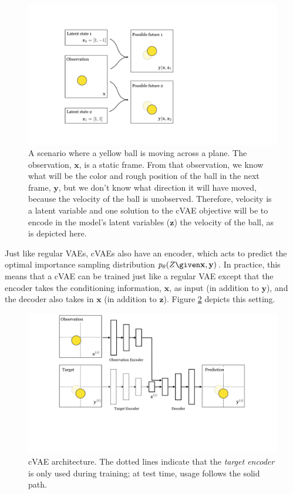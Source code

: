 \begin{figure}[h!]
    \centerline{
        \includegraphics[width=0.6\linewidth]{./figures/conditional_generative_models/cVAE_ball_bouncing_example.pdf}
    }
    \caption{A scenario where a yellow ball is moving across a plane. The observation, $\mathbf{x}$, is a static frame. From that observation, we know what will be the color and rough position of the ball in the next frame, $\mathbf{y}$, but we don't know what direction it will have moved, because the velocity of the ball is unobserved. Therefore, velocity is a latent variable and one solution to the cVAE objective will be to encode in the model's latent variables ($\mathbf{z}$) the velocity of the ball, as is depicted here.}
    \label{fig:conditional_generative_models:cVAE_ball_bouncing_example}
\end{figure}

Just like regular VAEs, cVAEs also have an encoder, which acts to predict the optimal importance sampling distribution $p_{\theta}(Z \given \mathbf{x}, \mathbf{y})$. In practice, this means that a cVAE can be trained just like a regular VAE except that the encoder takes the conditioning information, $\mathbf{x}$, as input (in addition to $\mathbf{y}$), and the decoder also takes in $\mathbf{x}$ (in addition to $\mathbf{z}$). Figure \ref{fig:conditional_generative_models:cVAE_ball_bouncing_example_nets} depicts this setting.
\begin{figure}[h!]
    \centerline{
        \includegraphics[width=0.9\linewidth]{./figures/conditional_generative_models/cVAE_ball_bouncing_example_nets.pdf}
    }
    \caption{cVAE architecture. The dotted lines indicate that the \textit{target encoder} is only used during training; at test time, usage follows the solid path.}
    \label{fig:conditional_generative_models:cVAE_ball_bouncing_example_nets}
\end{figure}

